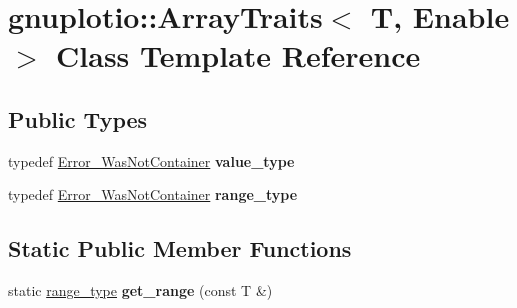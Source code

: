\hypertarget{classgnuplotio_1_1_array_traits}{}\section{gnuplotio\+:\+:Array\+Traits$<$ T, Enable $>$ Class Template Reference}
\label{classgnuplotio_1_1_array_traits}
\subsection*{Public Types}
\begin{DoxyCompactItemize}
\item 
typedef \hyperlink{structgnuplotio_1_1_error___was_not_container}{Error\+\_\+\+Was\+Not\+Container} {\bfseries value\+\_\+type}\hypertarget{classgnuplotio_1_1_array_traits_a3bcae12a7bf42af90f4946acc66f27e0}{}\label{classgnuplotio_1_1_array_traits_a3bcae12a7bf42af90f4946acc66f27e0}

\item 
typedef \hyperlink{structgnuplotio_1_1_error___was_not_container}{Error\+\_\+\+Was\+Not\+Container} {\bfseries range\+\_\+type}\hypertarget{classgnuplotio_1_1_array_traits_ae53464a5175c03deec403392b8dcb3c5}{}\label{classgnuplotio_1_1_array_traits_ae53464a5175c03deec403392b8dcb3c5}

\end{DoxyCompactItemize}
\subsection*{Static Public Member Functions}
\begin{DoxyCompactItemize}
\item 
static \hyperlink{structgnuplotio_1_1_error___was_not_container}{range\+\_\+type} {\bfseries get\+\_\+range} (const T \&)\hypertarget{classgnuplotio_1_1_array_traits_aee31432f330f9f9e4f5af628641181f7}{}\label{classgnuplotio_1_1_array_traits_aee31432f330f9f9e4f5af628641181f7}

\end{DoxyCompactItemize}
